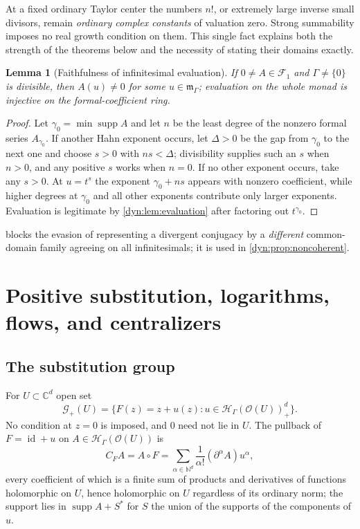\documentclass[11pt,letterpaper]{article}
\newtheorem{lemma}[lemma]{Lemma}
\theoremstyle{definition}
\theoremstyle{remark}
\newcommand{\C}{\mathbb C}
\newcommand{\N}{\mathbb N}
\newcommand{\HH}{\mathscr H}
\newcommand{\OO}{\mathcal O}
\newcommand{\GG}{\mathscr G}
\newcommand{\m}{\mathfrak m}
\newcommand{\id}{\operatorname{id}}
\newcommand{\supp}{\operatorname{supp}}
\numberwithin{equation}{section}
\begin{document}
At a fixed ordinary Taylor center the numbers $n!$, or extremely large
inverse small divisors, remain \emph{ordinary complex constants} of
valuation zero. Strong summability imposes no real growth condition on
them. This single fact explains both the strength of the theorems below and
the necessity of stating their domains exactly.

\begin{lemma}[Faithfulness of infinitesimal evaluation]\label{dyn:lem:faithful}
If $0\ne A\in\mathcal F_1$ and $\Gamma\ne\{0\}$ is divisible, then
$A(u)\ne0$ for some $u\in\m_\Gamma$; evaluation on the whole monad is
injective on the formal-coefficient ring.
\end{lemma}
\begin{proof}
Let $\gamma_0=\min\supp A$ and let $n$ be the least degree of the nonzero
formal series $A_{\gamma_0}$. If another Hahn exponent occurs, let
$\Delta>0$ be the gap from $\gamma_0$ to the next one and choose $s>0$ with
$ns<\Delta$; divisibility supplies such an $s$ when $n>0$, and any positive
$s$ works when $n=0$. If no other exponent occurs, take any $s>0$. At
$u=t^{s}$ the exponent $\gamma_0+ns$ appears with nonzero coefficient,
while higher degrees at $\gamma_0$ and all other exponents contribute only
larger exponents. Evaluation is legitimate by \cref{dyn:lem:evaluation}
after factoring out $t^{\gamma_0}$.
\end{proof}

 blocks the evasion of representing a divergent
conjugacy by a \emph{different} common-domain family agreeing on all
infinitesimals; it is used in \cref{dyn:prop:noncoherent}.

\section{Positive substitution, logarithms, flows, and centralizers}
\label{dyn:sec:substitution}

\subsection{The substitution group}
For $U\subset\C^{d}$ open set
\[
 \GG_+(U)=\{F(z)=z+u(z):u\in\HH_\Gamma(\OO(U))_+^{d}\}.
\]
No condition at $z=0$ is imposed, and $0$ need not lie in $U$. The pullback
of $F=\id+u$ on $A\in\HH_\Gamma(\OO(U))$ is
\begin{equation}\label{dyn:eq:pullback}
 C_FA=A\circ F=\sum_{\alpha\in\N^{d}}\frac1{\alpha!}(\partial^{\alpha}A)u^{\alpha},
\end{equation}
every coefficient of which is a finite sum of products and derivatives of
functions holomorphic on $U$, hence holomorphic on $U$ regardless of its
ordinary norm; the support lies in $\supp A+S^{*}$ for $S$ the union of the
supports of the components of $u$.
\end{document}

